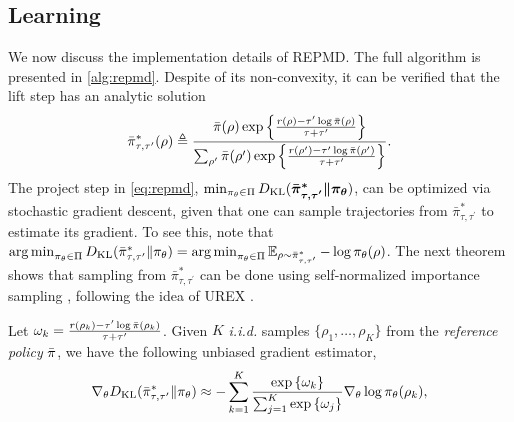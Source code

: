 \subsection{Learning}
\label{subsec:learning}
We now discuss the implementation details of REPMD. The full algorithm is presented in \cref{alg:repmd}.
Despite of its non-convexity, it can be verified that the lift step has an analytic solution
\begin{equation}
\label{eq:pitautauprime}
\bar{\pi}_{\tau,\tau^{\prime}}^*(\rho) \triangleq \frac{\bar{\pi}(\rho) \exp\left\{ \frac{r(\rho)-\tau^{\prime} \log \bar{\pi}(\rho) }{ \tau+\tau^{\prime}} \right\}}{ \sum_{\rho^{\prime}}{\bar{\pi}(\rho^{\prime}) \exp\left\{ \frac{r(\rho^{\prime})-\tau^{\prime} \log \bar{\pi}(\rho^{\prime})}{ \tau+\tau^{\prime}} \right\} } }.
\end{equation}
The project step in \cref{eq:repmd}, $\min\nolimits_{\pi_\theta \in \Pi}{D_{\mathrm{KL}}(\bm{ \bar{\pi}_{\tau,\tau^{\prime}}^* \| \pi_\theta }) }$, can be optimized via stochastic gradient descent, given that one can sample trajectories from $\bar{\pi}_{\tau,\tau^{\prime}}^*$ to estimate its gradient. To see this, note that $\operatorname*{arg\,min}\nolimits_{\pi_\theta \in \Pi}D_{\mathrm{KL}}(\bar{\pi}_{\tau,\tau^{\prime}}^* \| \pi_\theta) = \operatorname*{arg\,min}\nolimits_{\pi_\theta \in \Pi} \operatorname*{\mathbb{E}}_{\rho \sim \bar{\pi}_{\tau,\tau^{\prime}}^* }  - \log \pi_\theta(\rho)$. The next theorem shows that sampling from $\bar{\pi}_{\tau,\tau^{\prime}}^*$ can be done using self-normalized importance sampling \citep{owen2013monte}, following the idea of UREX \citep{nachum2017improving}.
\begin{thm}
\label{thm:repmdgradientestimate}
Let $\omega_k = \frac{r(\rho_k) - \tau^{\prime} \log{\bar{\pi}(\rho_k)} }{\tau + \tau^{\prime}}$. Given $K$ \emph{i.i.d.} samples $\{\rho_1, \dots, \rho_K\}$ from the \emph{reference policy} $\bar{\pi}$, we have the following unbiased gradient estimator,
\begin{equation}
\label{eq:gradient_estimator}
	\nabla_{\theta} D_{\mathrm{KL}}(\bar{\pi}_{\tau,\tau^{\prime}}^* \| \pi_\theta)\approx -\sum\limits_{k=1}^K{ \frac{ \exp\left\{ \omega_k \right\} }{ \sum_{j=1}^K{ \exp\left\{ \omega_j \right\}}} \nabla_{\theta} \log{\pi_\theta(\rho_k)} },
\end{equation}
\end{thm}


